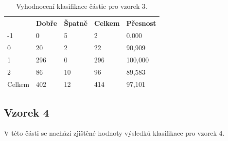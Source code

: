 \documentclass[11pt,twoside,a4paper,table]{book}
\begin{document}
\begin{table}[h]
\begin{center}
\begin{tabular}{lllll}
\rowcolor[HTML]{9B9B9B} 
\multicolumn{1}{|l|}{\cellcolor[HTML]{9B9B9B}Třída} & \multicolumn{1}{l|}{\cellcolor[HTML]{9B9B9B}Dobře} & \multicolumn{1}{l|}{\cellcolor[HTML]{9B9B9B}Špatně}  & \multicolumn{1}{l|}{\cellcolor[HTML]{9B9B9B}Celkem} & \multicolumn{1}{l|}{\cellcolor[HTML]{9B9B9B}Přesnost} \\ \hline
\multicolumn{1}{|l|}{-1}                            & \multicolumn{1}{l|}{0}                             & \multicolumn{1}{l|}{5}                               & \multicolumn{1}{l|}{2}                              & \multicolumn{1}{l|}{0,000}                            \\ \hline
\multicolumn{1}{|l|}{0}                             & \multicolumn{1}{l|}{20}                            & \multicolumn{1}{l|}{2}                               & \multicolumn{1}{l|}{22}                             & \multicolumn{1}{l|}{90,909}                           \\ \hline
\multicolumn{1}{|l|}{1}                             & \multicolumn{1}{l|}{296}                           & \multicolumn{1}{l|}{0}                               & \multicolumn{1}{l|}{296}                            & \multicolumn{1}{l|}{100,000}                          \\ \hline
\multicolumn{1}{|l|}{2}                             & \multicolumn{1}{l|}{86}                            & \multicolumn{1}{l|}{10}                              & \multicolumn{1}{l|}{96}                             & \multicolumn{1}{l|}{89,583}                           \\ \hline
\multicolumn{1}{|l|}{Celkem}                        & \multicolumn{1}{l|}{402}                           & \multicolumn{1}{l|}{12}                              & \multicolumn{1}{l|}{414}                            & \multicolumn{1}{l|}{97,101}                           \\ \hline
\end{tabular}
\end{center}
\caption{Vyhodnocení klasifikace částic pro vzorek 3.}
\label{tab:classresult3}
\end{table}

\newpage
\FloatBarrier
\subsection{Vzorek 4}
V této části se nachází zjištěné hodnoty výsledků klasifikace pro vzorek 4.
\end{document}
